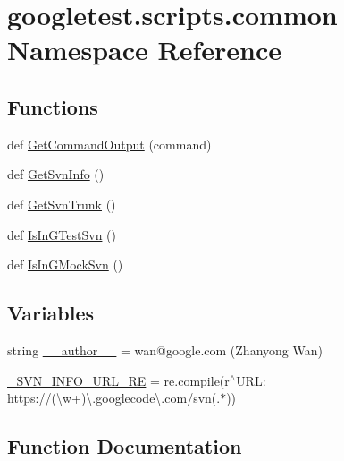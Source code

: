 \hypertarget{namespacegoogletest_1_1scripts_1_1common}{}\section{googletest.\+scripts.\+common Namespace Reference}
\label{namespacegoogletest_1_1scripts_1_1common}
\subsection*{Functions}
\begin{DoxyCompactItemize}
\item 
def \mbox{\hyperlink{namespacegoogletest_1_1scripts_1_1common_a35e6f62f3f4713b86e329724bf510833}{Get\+Command\+Output}} (command)
\item 
def \mbox{\hyperlink{namespacegoogletest_1_1scripts_1_1common_a5749e9f6b59977a3c38235877d6f46ec}{Get\+Svn\+Info}} ()
\item 
def \mbox{\hyperlink{namespacegoogletest_1_1scripts_1_1common_a8456e601f756b4a572d51add434d9f66}{Get\+Svn\+Trunk}} ()
\item 
def \mbox{\hyperlink{namespacegoogletest_1_1scripts_1_1common_a14b1316a139ba04a11410b4464f4461a}{Is\+In\+G\+Test\+Svn}} ()
\item 
def \mbox{\hyperlink{namespacegoogletest_1_1scripts_1_1common_a632fa0f65eb653d5feef5c7c597a5953}{Is\+In\+G\+Mock\+Svn}} ()
\end{DoxyCompactItemize}
\subsection*{Variables}
\begin{DoxyCompactItemize}
\item 
string \mbox{\hyperlink{namespacegoogletest_1_1scripts_1_1common_a21a0d2d66bd53eeb56c8a7043f269605}{\+\_\+\+\_\+author\+\_\+\+\_\+}} = \textquotesingle{}wan@google.\+com (Zhanyong Wan)\textquotesingle{}
\item 
\mbox{\hyperlink{namespacegoogletest_1_1scripts_1_1common_a2ad8ee62b771b826092d871a84354de3}{\+\_\+\+S\+V\+N\+\_\+\+I\+N\+F\+O\+\_\+\+U\+R\+L\+\_\+\+RE}} = re.\+compile(r\textquotesingle{}$^\wedge$U\+R\+L\+: https\+://(\textbackslash{}w+)\textbackslash{}.googlecode\textbackslash{}.\+com/svn(.$\ast$)\textquotesingle{})
\end{DoxyCompactItemize}


\subsection{Function Documentation}
\mbox{\label{namespacegoogletest_1_1scripts_1_1common_a35e6f62f3f4713b86e329724bf510833}} 
